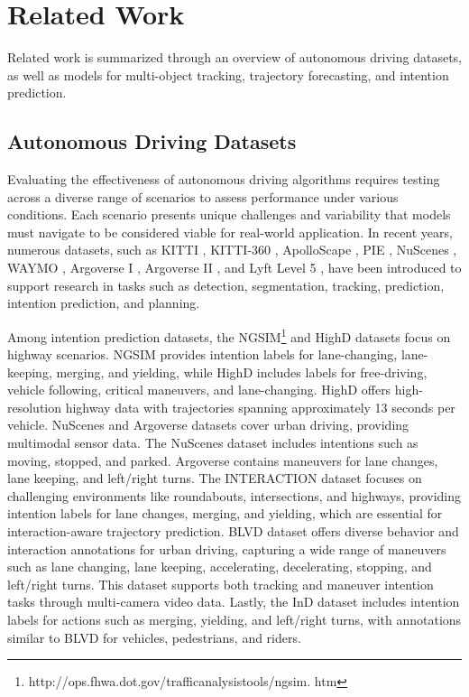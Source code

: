 \section{Related Work}
\label{sec:rel_work}

Related work is summarized through an overview of autonomous driving datasets, as well as models for multi-object tracking, trajectory forecasting, and intention prediction.

\subsection{Autonomous Driving Datasets}
Evaluating the effectiveness of autonomous driving algorithms requires testing across a diverse range of scenarios to assess performance under various conditions. Each scenario presents unique challenges and variability that models must navigate to be considered viable for real-world application. In recent years, numerous datasets, such as KITTI \cite{Geiger2013IJRR}, KITTI-360 \cite{Liao2022PAMI}, ApolloScape \cite{10.1609/aaai.v33i01.33016120}, PIE \cite{9008118}, NuScenes \cite{nuscenes2019}, WAYMO \cite{9709630}, Argoverse I \cite{Argoverse}, Argoverse II \cite{Argoverse2,TrustButVerify}, and Lyft Level 5 \cite{Houston2020OneTA}, have been introduced to support research in tasks such as detection, segmentation, tracking, prediction, intention prediction, and planning.

Among intention prediction datasets, the NGSIM\footnote{ http://ops.fhwa.dot.gov/trafficanalysistools/ngsim.
htm} and HighD \cite{10.1109/ITSC.2018.8569552} datasets focus on highway scenarios. NGSIM provides intention labels for lane-changing, lane-keeping, merging, and yielding, while HighD includes labels for free-driving, vehicle following, critical maneuvers, and lane-changing. HighD offers high-resolution highway data with trajectories spanning approximately 13 seconds per vehicle. NuScenes \cite{nuscenes2019} and Argoverse \cite{Argoverse} datasets cover urban driving, providing multimodal sensor data. The NuScenes dataset includes intentions such as moving, stopped, and parked. Argoverse contains maneuvers for lane changes, lane keeping, and left/right turns. The INTERACTION dataset \cite{zhan2019interactiondatasetinternationaladversarial} focuses on challenging environments like roundabouts, intersections, and highways, providing intention labels for lane changes, merging, and yielding, which are essential for interaction-aware trajectory prediction. BLVD dataset \cite{xue2019blvdbuildinglargescale5d} offers diverse behavior and interaction annotations for urban driving, capturing a wide range of maneuvers such as lane changing, lane keeping, accelerating, decelerating, stopping, and left/right turns. This dataset supports both tracking and maneuver intention tasks through multi-camera video data. Lastly, the InD dataset \cite{9304839} includes intention labels for actions such as merging, yielding, and left/right turns, with annotations similar to BLVD for vehicles, pedestrians, and riders.

